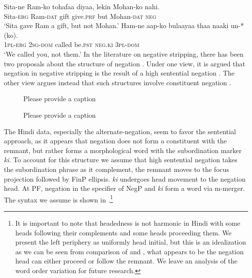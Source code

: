 \documentclass[output=paper]{langscibook}
\begin{document}
\ea \label{maex29}
    \gll Sita-ne Ram-ko tohafaa diyaa, lekin Mohan-ko nahi.\\
    Sita-\textsc{erg} Ram-\textsc{dat} gift give.\textsc{prf} but Mohan-\textsc{dat} \textsc{neg}\\
    \glt `Sita gave Ram a gift, but not Mohan.'
\ex \label{maex30}
    \gll Ham-ne aap-ko bulaayaa thaa naaki un-*(ko).\\
    \textsc{1pl-erg} \textsc{2sg-dom} called be.\textsc{pst} \textsc{neg.ki} \textsc{3pl-dom}\\
    \glt `We called you, not them.'
\z 
In the literature on negative stripping, there has been two proposals about the structure of negation \citep{merchant03,wurmbrand17,dendikken18}. Under one view, it is argued that negation in negative stripping is the result of a high sentential negation . The other view argues instead that such structures involve constituent negation .

\begin{figure}
\begin{floatrow}
\captionsetup{margin=.05\linewidth}
        {\caption{\color{red}Please provide a caption\label{maex31}}}
        {\caption{\color{red}Please provide a caption\label{maex32}}}
\end{floatrow}
\end{figure}
    
The Hindi data, especially the alternate-negation, seem to favor the sentential approach, as it appears that negation does not form a constituent with the remnant, but rather forms a morphological word with the subordination marker \emph{ki}. To account for this structure we assume that high sentential negation takes the subordination phrase as it complement, the remnant moves to the focus projection followed by FinP ellipsis. \emph{ki} undergoes head movement to the negation head. At PF, negation in the specifier of NegP and \emph{ki} form a word via m-merger. The syntax we assume is shown in .\footnote{It is important to note that headedness is not harmonic in Hindi with some heads following their complements and some heads proceeding them. We present the left periphery as uniformly head initial, but this is an idealization as we can be seen from comparison of  and , what appears to be the negation head can either proceed or follow the remnant. We leave an analysis of the word order variation for future research.}
\end{document}
